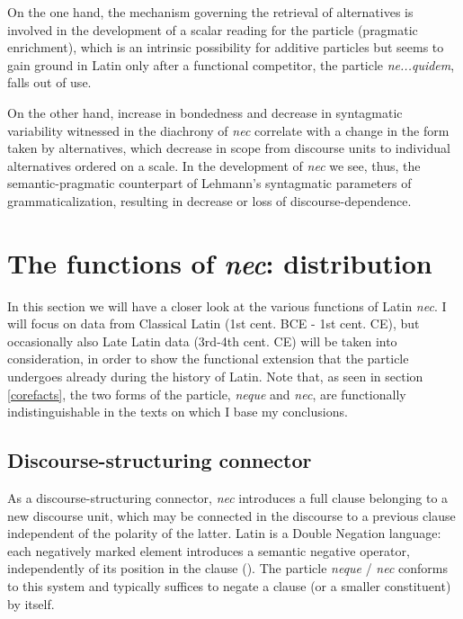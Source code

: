 \documentclass[output=paper,modfonts,nonflat,citecolor=brown,
showindex
]{langsci/langscibook}
\begin{document}
On the one hand, the mechanism governing the retrieval of alternatives is involved in the development of a scalar reading for the particle (pragmatic enrichment), which is an intrinsic possibility for additive particles but seems to gain ground in Latin only after a functional competitor, the particle {\emph{ne...quidem}}, falls out of use.  

On the other hand, increase in bondedness and decrease in syntagmatic variability witnessed in the diachrony of {\emph{nec}} correlate with a change in the form taken by alternatives, which decrease in scope from discourse units to individual alternatives ordered on a scale. In the development of {\emph{nec}} we see, thus, the semantic-pragmatic counterpart of Lehmann's syntagmatic parameters of grammaticalization, resulting in decrease or loss of discourse-dependence.  

\section{The functions of {\emph{nec}}: distribution} \label{distributionfunctions}

In this section we will have a closer look at the various functions of Latin {\emph{nec}}. I will focus on data from Classical Latin (1st cent. BCE - 1st cent. CE), but occasionally also Late Latin data (3rd-4th cent. CE) will be taken into consideration, in order to show the functional extension that the particle undergoes already during the history of Latin. Note that, as seen in section \ref{corefacts}, the two forms of the particle, {\emph{neque}} and {\emph{nec}}, are functionally indistinguishable in the texts on which I base my conclusions.

\subsection{Discourse-structuring connector}

As a discourse-structuring connector, {\emph{nec}} introduces a full clause belonging to a new discourse unit, which may be connected in the discourse to a previous clause independent of the polarity of the latter. Latin is a Double Negation language: each negatively marked element introduces a semantic negative operator, independently of its position in the clause (\citealt[]{Gianollo16}). The particle {\emph{neque}} / {\emph{nec}} conforms to this system and typically suffices to negate a clause (or a smaller constituent) by itself.
\end{document}
